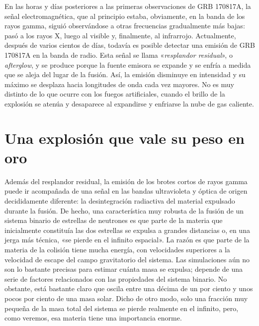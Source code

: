 En las horas y días posteriores a las primeras observaciones de GRB 170817A, la señal electromagnética, que al principio estaba, obviamente, en la banda de los rayos gamma, siguió observándose a otras frecuencias gradualmente más bajas: pasó a los rayos X, luego al visible y, finalmente, al infrarrojo. Actualmente, después de varios cientos de días, todavía es posible detectar una emisión de GRB 170817A en la banda de radio. Esta señal se llama «\emph{resplandor residual}», o \emph{afterglow}, y se produce porque la fuente emisora se expande y se enfría a medida que se aleja del lugar de la fusión. Así, la emisión disminuye en intensidad y su máximo se desplaza hacia longitudes de onda cada vez mayores. No es muy distinto de lo que ocurre con los fuegos artificiales, cuando el brillo de la explosión se atenúa y desaparece al expandirse y enfriarse la nube de gas caliente.

\section{Una explosión que vale su peso en oro}\label{sec:08-gold}

Además del resplandor residual, la emisión de los brotes cortos de rayos gamma puede ir acompañada de una señal en las bandas ultravioleta y óptica de origen decididamente diferente: la desintegración radiactiva del material expulsado durante la fusión. De hecho, una característica muy robusta de la fusión de un sistema binario de estrellas de neutrones es que parte de la materia que inicialmente constituía las dos estrellas se expulsa a grandes distancias o, en una jerga más técnica, «se pierde en el infinito espacial». La razón es que parte de la materia de la colisión tiene mucha energía, con velocidades superiores a la velocidad de escape del campo gravitatorio del sistema. Las simulaciones aún no son lo bastante precisas para estimar cuánta masa se expulsa; depende de una serie de factores relacionados con las propiedades del sistema binario. No obstante, está bastante claro que oscila entre una décima de un por ciento y unos pocos por ciento de una masa solar. Dicho de otro modo, solo una fracción muy pequeña de la masa total del sistema se pierde realmente en el infinito, pero, como veremos, esa materia tiene una importancia enorme.

